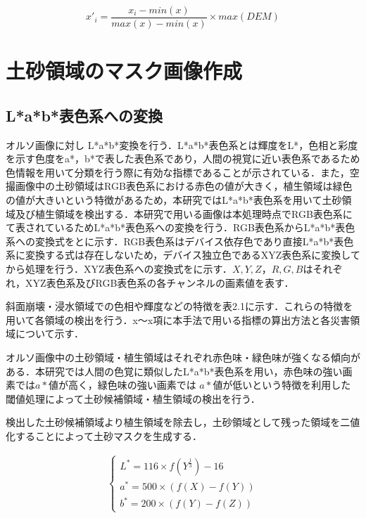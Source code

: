       \begin{equation}
        \label{正規化}
        x'_{i} = \dfrac{x_{i} - min(x)} {max(x) - min(x)} \times max(DEM) 
      \end{equation}


  \section{土砂領域のマスク画像作成}
    \label{土砂マスク}
    \subsection{L*a*b*表色系への変換}
      オルソ画像に対し L*a*b*変換\cite{Lab表色系1}を行う．L*a*b*表色系とは輝度をL*，色相と彩度を示す色度をa*，b*で表した表色系であり，人間の視覚に近い表色系であるため色情報を用いて分類を行う際に有効な指標であることが示されている．また，空撮画像中の土砂領域はRGB表色系における赤色の値が大きく，植生領域は緑色の値が大きいという特徴があるため，本研究ではL*a*b*表色系を用いて土砂領域及び植生領域を検出する\cite{Lab表色系2, Lab表色系3, Lab表色系4}．本研究で用いる画像は本処理時点でRGB表色系にて表されているためL*a*b*表色系への変換を行う．RGB表色系からL*a*b*表色系への変換式をとに示す．RGB表色系はデバイス依存色であり直接L*a*b*表色系に変換する式は存在しないため，デバイス独立色であるXYZ表色系\cite{XYZ表色系}に変換してから処理を行う．XYZ表色系への変換式をに示す．$X,Y,Z$，$R,G,B$はそれぞれ，XYZ表色系及びRGB表色系の各チャンネルの画素値を表す．




      斜面崩壊・浸水領域での色相や輝度などの特徴を表2.1に示す．これらの特徴を用いて各領域の検出を行う．x〜x項に本手法で用いる指標の算出方法と各災害領域について示す．

      オルソ画像中の土砂領域・植生領域はそれぞれ赤色味・緑色味が強くなる傾向がある．本研究では人間の色覚に類似したL*a*b*表色系を用い，赤色味の強い画素では$a*$値が高く，緑色味の強い画素では $a*$値が低いという特徴を利用した閾値処理によって土砂候補領域・植生領域の検出を行う．
      
      検出した土砂候補領域より植生領域を除去し，土砂領域として残った領域を二値化することによって土砂マスクを生成する．


      
      \begin{eqnarray}
      \label{Lab表色系1}
        \left\{
          \begin{array}{l}
            L^* = 116 \times f(Y^{\frac{1}{3}}) - 16 \\
            a^* = 500 \times (f(X) - f(Y)) \\
            b^* = 200 \times (f(Y) - f(Z))
          \end{array}
        \right.
      \end{eqnarray}

